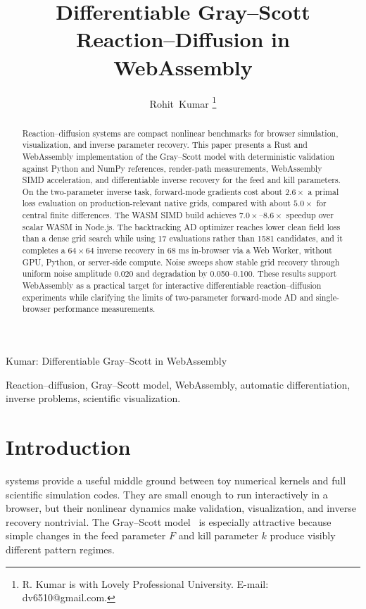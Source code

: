 \documentclass[journal]{IEEEtran}
\begin{document}
\title{Differentiable Gray--Scott Reaction--Diffusion in WebAssembly}

\author{Rohit~Kumar%
\thanks{R. Kumar is with Lovely Professional University. E-mail:
dv6510@gmail.com.}}

%
{Kumar: Differentiable Gray--Scott in WebAssembly}

\maketitle

\begin{abstract}
Reaction--diffusion systems are compact nonlinear benchmarks for browser
simulation, visualization, and inverse parameter recovery. This paper presents a
Rust and WebAssembly implementation of the Gray--Scott model with deterministic
validation against Python and NumPy references, render-path measurements,
WebAssembly SIMD acceleration, and differentiable inverse recovery for the feed
and kill parameters. On the two-parameter inverse task, forward-mode gradients
cost about \(2.6\times\) a primal loss evaluation on production-relevant native
grids, compared with about \(5.0\times\) for central finite differences. The
WASM SIMD build achieves \(7.0\times\)--\(8.6\times\) speedup over scalar WASM
in Node.js. The backtracking AD optimizer reaches lower clean field loss than a
dense grid search while using 17 evaluations rather than 1581 candidates, and
it completes a \(64\times64\) inverse recovery in 68 ms in-browser via a Web
Worker, without GPU, Python, or server-side compute. Noise sweeps show stable
grid recovery through uniform noise amplitude 0.020 and degradation by
0.050--0.100. These results support WebAssembly as a practical target for
interactive differentiable reaction--diffusion experiments while clarifying the
limits of two-parameter forward-mode AD and single-browser performance
measurements.
\end{abstract}

\begin{IEEEkeywords}
Reaction--diffusion, Gray--Scott model, WebAssembly, automatic
differentiation, inverse problems, scientific visualization.
\end{IEEEkeywords}

\IEEEpeerreviewmaketitle

\section{Introduction}
 systems provide a useful middle ground
between toy numerical kernels and full scientific simulation codes. They are
small enough to run interactively in a browser, but their nonlinear dynamics
make validation, visualization, and inverse recovery nontrivial. The Gray--Scott
model~\cite{gray1984autocatalytic} is especially attractive because simple
changes in the feed parameter \(F\) and kill parameter \(k\) produce visibly
different pattern regimes.
\end{document}

